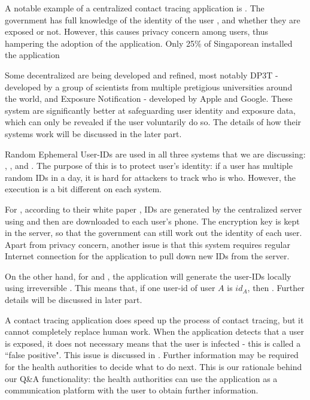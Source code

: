     \par A notable example of a centralized contact tracing application is \BlueTrace. The government has full knowledge of the identity of the user \cite{BlueTrace1}, and whether they are exposed or not. However, this causes privacy concern among users, thus hampering the adoption of the application. Only 25\% of Singaporean installed the application \cite{UserAcceptance2}

    \par Some decentralized are being developed and refined, most notably DP3T - developed by a group of scientists from multiple pretigious universities around the world, and Exposure Notification - developed by Apple and Google. These system are significantly better at safeguarding user identity and exposure data, which can only be revealed if the user voluntarily do so. The details of how their systems work will be discussed in the later part.

    \par Random Ephemeral User-IDs are used in all three systems that we are discussing: \BlueTrace, \DPTTT, and \ExposureNotification. The purpose of this is to protect user's identity: if a user has multiple random IDs in a day, it is hard for attackers to track who is who. However, the execution is a bit different on each system.
    \par For \BlueTrace, according to their white paper \cite{BlueTrace1}, IDs are generated by the centralized server using  and then are downloaded to each user's phone. The encryption key is kept in the server, so that the government can still work out the identity of each user. Apart from privacy concern, another issue is that this system requires regular Internet connection for the application to pull down new IDs from the server.
    \par On the other hand, for \DPTTT and \ExposureNotification, the application will generate the user-IDs locally using irreversible  \cite{DP3T1} \cite{ExpoNoti2}. This means that, if one user-id of user $A$ is $id_{A}$, then . Further details will be discussed in later part.

    \par A contact tracing application does speed up the process of contact tracing, but it cannot completely replace human work. When the application detects that a user is exposed, it does not necessary means that the user is infected - this is called a ``false positive". This issue is discussed in \cite{BlueTrace1}. Further information may be required for the health authorities to decide what to do next. This is our rationale behind our Q\&A functionality: the health authorities can use the application as a communication platform with the user to obtain further information.

